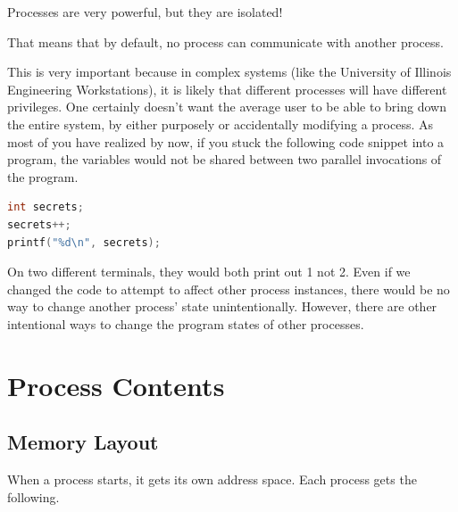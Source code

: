 Processes are very powerful, but they are isolated!

That means that by default, no process can communicate with another process.

This is very important because in complex systems (like the University of Illinois Engineering Workstations), it is likely that different processes will have different privileges.
One certainly doesn't want the average user to be able to bring down the entire system, by either purposely or accidentally modifying a process.
As most of you have realized by now, if you stuck the following code snippet into a program, the variables would not be shared between two parallel invocations of the program.

\begin{lstlisting}[language=C]
int secrets;
secrets++;
printf("%d\n", secrets);
\end{lstlisting}

On two different terminals, they would both print out 1 not 2.
Even if we changed the code to attempt to affect other process instances, there would be no way to change another process' state unintentionally.
However, there are other intentional ways to change the program states of other processes.

\section{Process Contents}

\subsection{Memory Layout}

When a process starts, it gets its own address space.
Each process gets the following.

